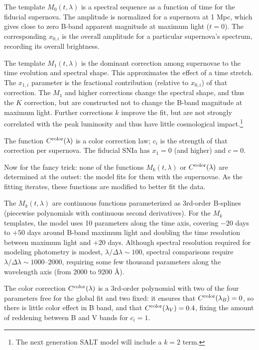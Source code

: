 The template $M_0(t,\lambda)$ is a spectral sequence as a function of time for the fiducial supernova.  The amplitude is normalized for a supernova at 1 Mpc, {which gives close to zero B-band apparent magnitude at maximum light} ($t=0$). {The corresponding $x_{0,i}$ is the overall amplitude for a particular supernova's spectrum, recording its overall brightness}.

The template $M_1(t,\lambda)$ is the dominant correction among supernovae to the time evolution and spectral shape.  This approximates the effect of a time stretch.  The $x_{1,i}$ parameter is the fractional contribution (relative to $x_{0,i}$) of that correction.  The $M_1$ and higher corrections change the spectral shape, and thus the $K$ correction, but are constructed not to change the B-band magnitude at maximum light.
Further corrections $k$ improve the fit, but are not strongly correlated with the peak luminosity and thus have little cosmological impact.\footnote{The next generation SALT model will include a $k=2$ term.}

The function $C^{\rm color}(\lambda)$ is a color correction law; $c_i$ is the strength of that correction per supernova.  The fiducial SNIa has $x_1 = 0$ (and higher) and $c = 0$.

Now for the fancy trick: none of the functions $M_k(t,\lambda)$ or $C^{\rm color}(\lambda)$ are determined at the outset: the model fits for them with the supernovae.  As the fitting iterates, these functions are modified to better fit the data.

The $M_k(t,\lambda)$ are continuous functions parameterized as 3rd-order B-splines (piecewise polynomials with continuous second derivatives).  For the $M_k$ templates, the model uses 10 parameters along the time axis, covering $-20$ days to $+50$ days around B-band maximum light and doubling the time resolution between maximum light and $+20$ days.  Although spectral resolution required for modeling photometry is modest, $\lambda/\Delta\lambda \sim 100$, spectral comparisons require $\lambda/\Delta\lambda \sim 1000$--$2000$, requiring some few thousand parameters along the wavelength axis (from 2000 to 9200 \AA).

The color correction $C^{\rm color}(\lambda)$ is a 3rd-order polynomial with two of the four parameters free for the global fit and two fixed: it ensures that $C^{\rm color}(\lambda_B) = 0$, so there is little color effect in B band, and that $C^{\rm color}(\lambda_V) = 0.4$, fixing the amount of reddening between B and V bands for $c_i = 1$.  

